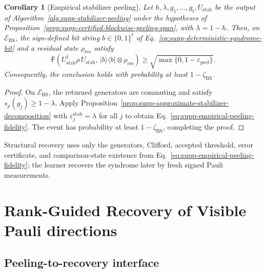 \documentclass[
  aps,
  prx,
  reprint,
  superscriptaddress,
  amsmath,
  amssymb,
  nofootinbib,
  longbibliography
]{revtex4-2}
\newtheorem{corollary}[theorem]{Corollary}
\newcommand{\F}{\mathsf{F}}
\begin{document}
\begin{corollary}[Empirical stabilizer peeling]
\label{cor:supp-empirical-stabilizer-peeling}
\label{prop:supp-empirical-peeling}
Let $h,\lambda,g_1,\dots,g_t,U_{\mathrm{stab}}$ be the output of
Algorithm~\ref{alg:supp-stabilizer-peeling} under the hypotheses of
Proposition~\ref{prop:supp-certified-blockwise-peeling-span}, with
$\lambda=1-h$.  Then, on $\mathcal E_{\mathrm{BS}}$, the sign-defined bit
string $b\in\{0,1\}^t$ of
Eq.~\eqref{eq:supp-deterministic-syndrome-bit} and a residual state
$\rho_{\mathrm{res}}$ satisfy
\begin{equation}
\F\!\left(
U_{\mathrm{stab}}^\dagger \rho\, U_{\mathrm{stab}},\,
|b\rangle\!\langle b|\otimes \rho_{\mathrm{res}}
\right)
\ge
\sqrt{\max\{0,1-\varepsilon_{\mathrm{peel}}\}}.
\label{eq:supp-empirical-peeling-fidelity}
\end{equation}
Consequently, the conclusion holds with probability at least
$1-\zeta_{\mathrm{BS}}$.
\end{corollary}

\begin{proof}
On $\mathcal E_{\mathrm{BS}}$, the returned generators are commuting and
satisfy $s_\rho(g_j)\ge1-\lambda$.  Apply
Proposition~\ref{prop:supp-approximate-stabilizer-decomposition} with
$\varepsilon_j^{\mathrm{stab}}=\lambda$ for all $j$ to obtain
Eq.~\eqref{eq:supp-empirical-peeling-fidelity}.
The event has probability at least $1-\zeta_{\mathrm{BS}}$, completing the
proof.
\end{proof}

Structural recovery uses only the generators, Clifford, accepted threshold,
error certificate, and comparison-state existence from
Eq.~\eqref{eq:supp-empirical-peeling-fidelity}; the learner recovers the
syndrome later by fresh signed Pauli measurements.

\section{Rank-Guided Recovery of Visible Pauli directions}
\label{sec:supp-rank-guided-recovery}


\subsection{Peeling-to-recovery interface}
\label{sec:supp-residual-representatives-score-control}
\end{document}
